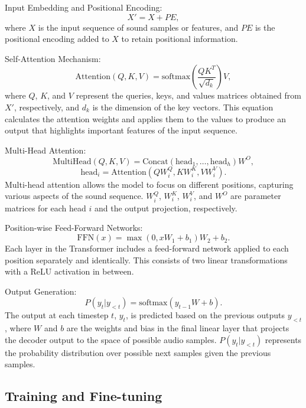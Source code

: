 \documentclass[11pt,a4paper,oneside]{report}
\begin{document}
Input Embedding and Positional Encoding:
\begin{equation}
X' = X + PE,
\end{equation}
where $X$ is the input sequence of sound samples or features, and $PE$ is the positional encoding added to $X$ to retain positional information.

Self-Attention Mechanism:
\begin{equation}
\text{Attention}(Q, K, V) = \text{softmax}\left(\frac{QK^T}{\sqrt{d_k}}\right)V,
\end{equation}
where $Q$, $K$, and $V$ represent the queries, keys, and values matrices obtained from $X'$, respectively, and $d_k$ is the dimension of the key vectors. This equation calculates the attention weights and applies them to the values to produce an output that highlights important features of the input sequence.

Multi-Head Attention:
\begin{equation}
\text{MultiHead}(Q, K, V) = \text{Concat}(\text{head}_1, \ldots, \text{head}_h)W^O,
\end{equation}
\begin{equation}
\text{head}_i = \text{Attention}(QW^Q_i, KW^K_i, VW^V_i).
\end{equation}
Multi-head attention allows the model to focus on different positions, capturing various aspects of the sound sequence. $W^Q_i$, $W^K_i$, $W^V_i$, and $W^O$ are parameter matrices for each head $i$ and the output projection, respectively.

Position-wise Feed-Forward Networks:
\begin{equation}
\text{FFN}(x) = \max(0, xW_1 + b_1)W_2 + b_2.
\end{equation}
Each layer in the Transformer includes a feed-forward network applied to each position separately and identically. This consists of two linear transformations with a ReLU activation in between.

Output Generation:
\begin{equation}
P(y_t | y_{<t}) = \text{softmax}(y_{t-1}W + b).
\end{equation}
The output at each timestep $t$, $y_t$, is predicted based on the previous outputs $y_{<t}$, where $W$ and $b$ are the weights and bias in the final linear layer that projects the decoder output to the space of possible audio samples. $P(y_t | y_{<t})$ represents the probability distribution over possible next samples given the previous samples.

\subsection*{Training and Fine-tuning}
\end{document}
